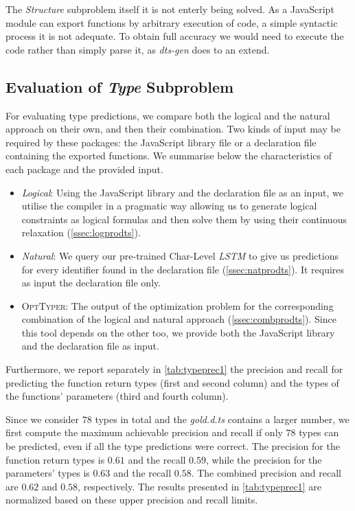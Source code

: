 \documentclass[sigplan,10pt,review,anonymous]{acmart} %
\newcommand{\projectname}{\textsc{OptTyper}\xspace}
\theoremstyle{plain}
\theoremstyle{remark}
\theoremstyle{definition}
\begin{document}
The \textit{Structure} subproblem itself it is not enterly being solved.  As a JavaScript module can export functions by arbitrary execution of code, a simple syntactic process it is not adequate. To obtain full accuracy we would need to execute the code rather than simply parse it, as \textit{dts-gen} does to an extend.
\subsection{Evaluation of \textit{Type} Subproblem}
For evaluating type predictions,
we compare both the logical and the natural approach on their own,
and then their combination.
Two kinds of input may be required by these packages:
the JavaScript library file or a declaration file containing the exported functions.
We summarise below the characteristics of each package and the provided input.
\begin{itemize}[label={\tiny$\bullet$}]
	\item \textit{Logical}: Using the JavaScript library and the declaration file as an input,
	      we utilise the compiler in a pragmatic way allowing us to generate logical constraints as logical formulas
	      and then solve them by using their continuous relaxation (\cref{ssec:logprodts}).
	\item \textit{Natural}: We query our pre-trained Char-Level \textit{LSTM} to give us predictions for every identifier
	      found in the declaration file (\cref{ssec:natprodts}).
	      It requires as input the declaration file only.
	\item \projectname: The output of the optimization problem for the corresponding combination of the logical
	      and natural approach (\cref{ssec:combprodts}).
	      Since this tool depends on the other too, we provide both the JavaScript library
	      and the declaration file as input.
\end{itemize}
Furthermore, we report separately in \cref{tab:typeprec1} the precision and recall for predicting the function return types (first and second column) and the types of the functions' parameters (third and fourth column).

Since we consider $78$ types in total and the \textit{gold.d.ts} contains a larger number,
we first compute the maximum achievable precision and recall if only $78$ types can be predicted,
even if all the type predictions were correct.
The precision for the function return types is $0.61$ and the recall $0.59$,
while the precision for the parameters' types is $0.63$ and the recall $0.58$.
The combined precision and recall are $0.62$ and $0.58$, respectively.
The results presented in \cref{tab:typeprec1} are normalized based on these upper precision and recall limits.
\end{document}
